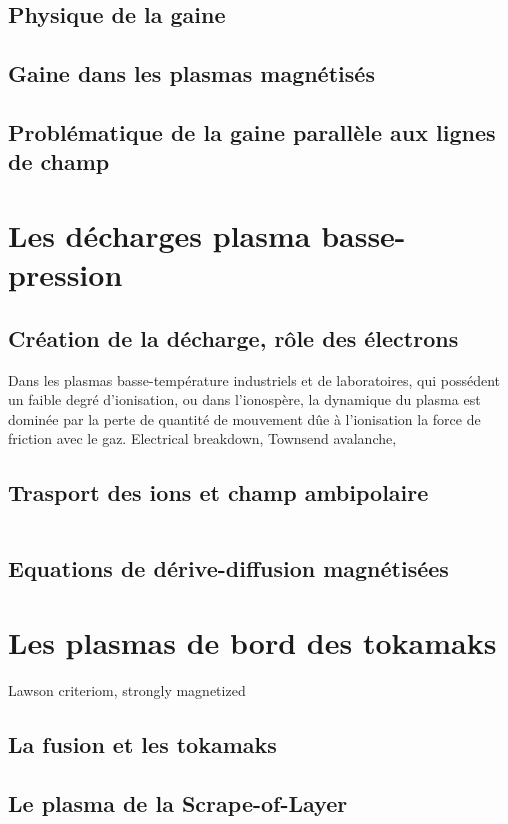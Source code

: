 \subsection{Physique de la gaine}
\subsection{Gaine dans les plasmas magnétisés}
\subsection{Problématique de la gaine parallèle aux lignes de champ}

\section{Les décharges plasma basse-pression}
\subsection{Création de la décharge, rôle des électrons}
Dans les plasmas basse-température industriels et de laboratoires, qui possédent
un faible degré d'ionisation, ou dans l'ionospère, la dynamique du plasma est dominée par
la perte de quantité de mouvement dûe à l'ionisation la force de friction avec le gaz.
Electrical breakdown, Townsend avalanche,
\subsection{Trasport des ions et champ ambipolaire}
\begin{equation}
\label{derivediffusion}
\end{equation}
\subsection{Equations de dérive-diffusion magnétisées}

\section{Les plasmas de bord des tokamaks}
Lawson criteriom, strongly magnetized
\subsection{La fusion et les tokamaks}
\subsection{Le plasma de la Scrape-of-Layer}
